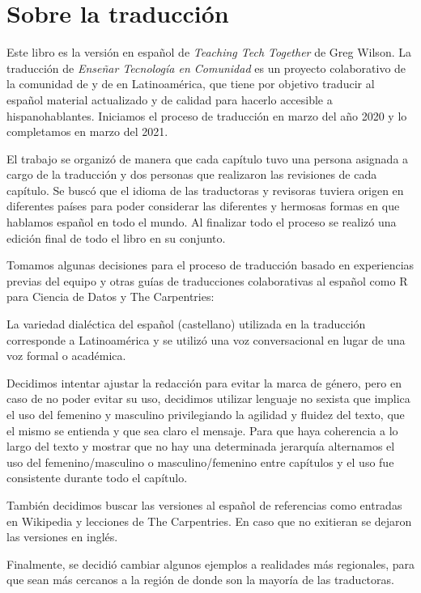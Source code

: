 \chapter*{Sobre la traducción}

Este libro es la versión en español de \emph{Teaching Tech Together} de Greg Wilson.
La traducción de \emph{Enseñar Tecnología en Comunidad} es un proyecto colaborativo
de la comunidad de 
y de  en Latinoamérica,
que tiene por objetivo traducir al español material actualizado y de calidad para hacerlo accesible a hispanohablantes.
Iniciamos el proceso de traducción en marzo del año 2020 y lo completamos en marzo del 2021.

El trabajo se organizó de manera que cada capítulo tuvo una persona asignada a cargo de la traducción 
y dos personas que realizaron las revisiones de cada capítulo.  
Se buscó que el idioma de las traductoras y revisoras tuviera origen en diferentes países para
 poder considerar las diferentes y hermosas formas en que hablamos español en todo el mundo.
Al finalizar todo el proceso se realizó una edición final de todo el libro en su conjunto.

Tomamos algunas decisiones para el proceso de traducción basado en experiencias previas
del equipo y otras guías de traducciones colaborativas al español como {R para Ciencia de Datos}{}
y {The Carpentries}{}:

La variedad dialéctica del español (castellano) utilizada en la traducción corresponde 
a Latinoamérica y se utilizó una voz conversacional en lugar de una voz formal o académica.

Decidimos intentar ajustar la redacción para evitar la marca de género, pero
en caso de no poder evitar su uso, decidimos utilizar lenguaje no sexista  
que implica el uso del femenino y masculino privilegiando la agilidad y fluidez del texto, 
que el mismo se entienda y que sea claro el mensaje. Para que haya coherencia 
a lo largo del texto y mostrar que no hay una determinada jerarquía 
alternamos el uso del femenino/masculino o masculino/femenino entre capítulos 
y el uso fue consistente durante todo el capítulo. 

También decidimos buscar las versiones al español de referencias como 
entradas en Wikipedia y lecciones de The Carpentries.  En caso que no exitieran 
se dejaron las versiones en inglés.

Finalmente, se decidió cambiar algunos ejemplos a realidades más regionales, 
para que sean más cercanos a la región de donde son la mayoría de las
traductoras.

